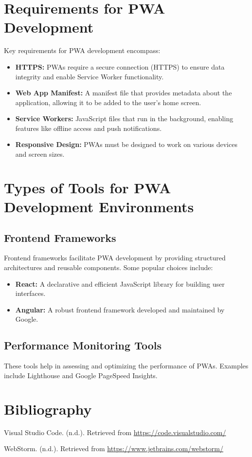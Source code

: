 \documentclass[]{article}
\begin{document}
	\section{Requirements for PWA Development}
	Key requirements for PWA development encompass:
	
	\begin{itemize}
		\item \textbf{HTTPS:} PWAs require a secure connection (HTTPS) to ensure data integrity and enable Service Worker functionality.
		
		\item \textbf{Web App Manifest:} A manifest file that provides metadata about the application, allowing it to be added to the user's home screen.
		
		\item \textbf{Service Workers:} JavaScript files that run in the background, enabling features like offline access and push notifications.
		
		\item \textbf{Responsive Design:} PWAs must be designed to work on various devices and screen sizes.
	\end{itemize}
	
	\section{Types of Tools for PWA Development Environments}
	
	\subsection{Frontend Frameworks}
	Frontend frameworks facilitate PWA development by providing structured architectures and reusable components. Some popular choices include:
	
	\begin{itemize}
		\item \textbf{React:} A declarative and efficient JavaScript library for building user interfaces.
		
		\item \textbf{Angular:} A robust frontend framework developed and maintained by Google.
	\end{itemize}
	
	\subsection{Performance Monitoring Tools}
	These tools help in assessing and optimizing the performance of PWAs. Examples include Lighthouse and Google PageSpeed Insights.
	
	
	\section{Bibliography}
	\begin{thebibliography}{9}
		 Visual Studio Code. (n.d.). Retrieved from \url{https://code.visualstudio.com/}
		
		 WebStorm. (n.d.). Retrieved from \url{https://www.jetbrains.com/webstorm/}
	\end{thebibliography}
	
\end{document}
